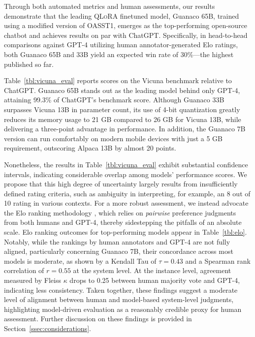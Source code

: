 Through both automated metrics and human assessments, our results demonstrate that the leading \textsc{QLoRA} finetuned model, {Guanaco} 65B, trained using a modified version of OASST1, emerges as the top-performing open-source chatbot and achieves results on par with ChatGPT. Specifically, in head-to-head comparisons against GPT-4 utilizing human annotator-generated Elo ratings, both {Guanaco} 65B and 33B yield an expected win rate of 30\%—the highest published so far.

Table~\ref{tbl:vicuna_eval} reports scores on the Vicuna benchmark \cite{vicuna2023} relative to ChatGPT. {Guanaco} 65B stands out as the leading model behind only GPT-4, attaining 99.3\% of ChatGPT's benchmark score. Although {Guanaco} 33B surpasses Vicuna 13B in parameter count, its use of 4-bit quantization greatly reduces its memory usage to 21 GB compared to 26 GB for Vicuna 13B, while delivering a three-point advantage in performance. In addition, the {Guanaco} 7B version can run comfortably on modern mobile devices with just a 5 GB requirement, outscoring Alpaca 13B by almost 20 points.

Nonetheless, the results in Table~\ref{tbl:vicuna_eval} exhibit substantial confidence intervals, indicating considerable overlap among models’ performance scores. We propose that this high degree of uncertainty largely results from insufficiently defined rating criteria, such as ambiguity in interpreting, for example, an 8 out of 10 rating in various contexts. For a more robust assessment, we instead advocate the Elo ranking methodology \citep{elo1967proposed}, which relies on \textit{pairwise} preference judgments from both humans and GPT-4, thereby sidestepping the pitfalls of an absolute scale. Elo ranking outcomes for top-performing models appear in Table~\ref{tbl:elo}. Notably, while the rankings by human annotators and GPT-4 are not fully aligned, particularly concerning Guanaco 7B, their concordance across most models is moderate, as shown by a Kendall Tau of $\tau=0.43$ and a Spearman rank correlation of $r=0.55$ at the system level. At the instance level, agreement measured by Fleiss $\kappa$ drops to 0.25 between human majority vote and GPT-4, indicating less consistency. Taken together, these findings suggest a moderate level of alignment between human and model-based system-level judgments, highlighting model-driven evaluation as a reasonably credible proxy for human assessment. Further discussion on these findings is provided in Section~\ref{ssec:considerations}.

